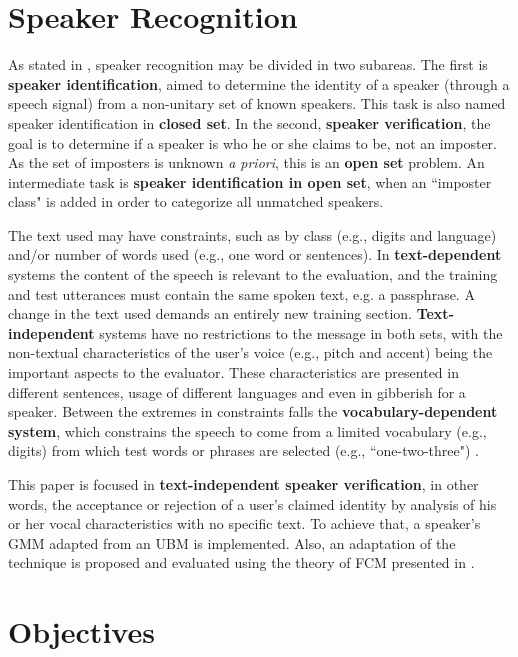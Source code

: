 \section{Speaker Recognition}

As stated in \cite{pinheiro.2013}, speaker recognition may be divided in two subareas. The first is \textbf{speaker identification}, aimed to determine the identity of a speaker (through a speech signal) from a non-unitary set of known speakers. This task is also named speaker identification in \textbf{closed set}. In the second, \textbf{speaker verification}, the goal is to determine if a speaker is who he or she claims to be, not an imposter. As the set of imposters is unknown \emph{a priori}, this is an \textbf{open set} problem. An intermediate task is \textbf{speaker identification in open set}, when an ``imposter class" is added in order to categorize all unmatched speakers.

The text used may have constraints, such as by class (e.g., digits and language) and/or number of words used (e.g., one word or sentences). In \textbf{text-dependent} systems the content of the speech is relevant to the evaluation, and the training and test utterances must contain the same spoken text, e.g. a passphrase. A change in the text used demands an entirely new training section. \textbf{Text-independent} systems have no restrictions to the message in both sets, with the non-textual characteristics of the user's voice (e.g., pitch and accent) being the important aspects to the evaluator. These characteristics are presented in different sentences, usage of different languages and even in gibberish for a speaker. Between the extremes in constraints falls the \textbf{vocabulary-dependent system}, which constrains the speech to come from a limited vocabulary (e.g., digits) from which test words or phrases are selected (e.g., ``one-two-three") \cite{reynolds.1995}.

This paper is focused in \textbf{text-independent speaker verification}, in other words, the acceptance or rejection of a user's claimed identity by analysis of his or her vocal characteristics with no specific text. To achieve that, a speaker's GMM adapted from an UBM \cite{reynolds.quatieri.dunn.2000} is implemented. Also, an adaptation of the technique is proposed and evaluated using the theory of FCM presented in \cite{gao.zhou.pu.2013}.

\section{Objectives}

